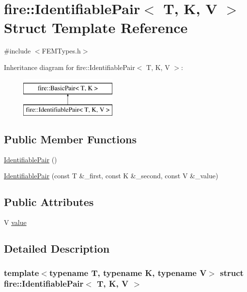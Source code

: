 \hypertarget{a00772}{}\section{fire\+:\+:Identifiable\+Pair$<$ T, K, V $>$ Struct Template Reference}
\label{a00772}


{\ttfamily \#include $<$F\+E\+M\+Types.\+h$>$}

Inheritance diagram for fire\+:\+:Identifiable\+Pair$<$ T, K, V $>$\+:\begin{figure}[H]
\begin{center}
\leavevmode
\includegraphics[height=2.000000cm]{a00772}
\end{center}
\end{figure}
\subsection*{Public Member Functions}
\begin{DoxyCompactItemize}
\item 
\hyperlink{a00772_a00a1d2e1fc20b2edf8e27dc3158d8826}{Identifiable\+Pair} ()
\item 
\hyperlink{a00772_ade6ddca350a2128a5cab071118c26fee}{Identifiable\+Pair} (const T \&\+\_\+first, const K \&\+\_\+second, const V \&\+\_\+value)
\end{DoxyCompactItemize}
\subsection*{Public Attributes}
\begin{DoxyCompactItemize}
\item 
V \hyperlink{a00772_a4aa238990585cb35d1902140ebe6fb9f}{value}
\end{DoxyCompactItemize}


\subsection{Detailed Description}
\subsubsection*{template$<$typename T, typename K, typename V$>$\newline
struct fire\+::\+Identifiable\+Pair$<$ T, K, V $>$}

